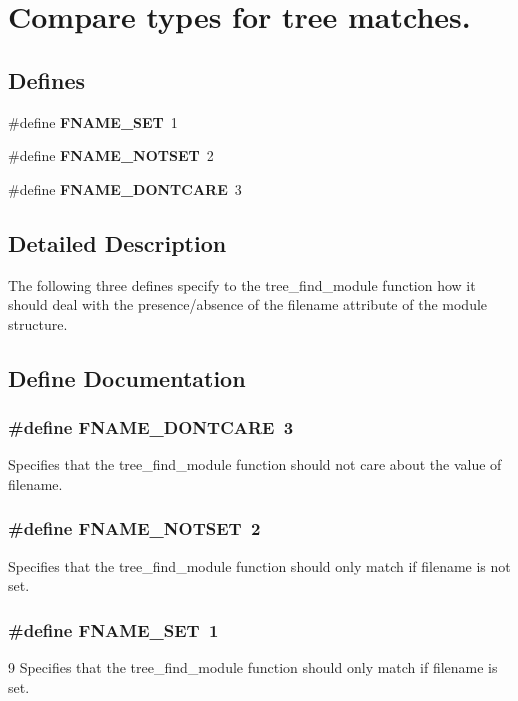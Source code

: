 \section{Compare types for tree matches.}
\label{group__tree__fname__comps}
\subsection*{Defines}
\begin{CompactItemize}
\item 
\#define {\bf FNAME\_\-SET}\ 1
\item 
\#define {\bf FNAME\_\-NOTSET}\ 2
\item 
\#define {\bf FNAME\_\-DONTCARE}\ 3
\end{CompactItemize}


\subsection{Detailed Description}
The following three defines specify to the tree\_\-find\_\-module function how it should deal with the presence/absence of the filename attribute of the module structure. 

\subsection{Define Documentation}
\subsubsection{\setlength{\rightskip}{0pt plus 5cm}\#define FNAME\_\-DONTCARE\ 3}\label{group__tree__fname__comps_a2}


Specifies that the tree\_\-find\_\-module function should not care about the value of filename. 
\subsubsection{\setlength{\rightskip}{0pt plus 5cm}\#define FNAME\_\-NOTSET\ 2}\label{group__tree__fname__comps_a1}


Specifies that the tree\_\-find\_\-module function should only match if filename is not set. 
\subsubsection{\setlength{\rightskip}{0pt plus 5cm}\#define FNAME\_\-SET\ 1}\label{group__tree__fname__comps_a0}


9 Specifies that the tree\_\-find\_\-module function should only match if filename is set. 